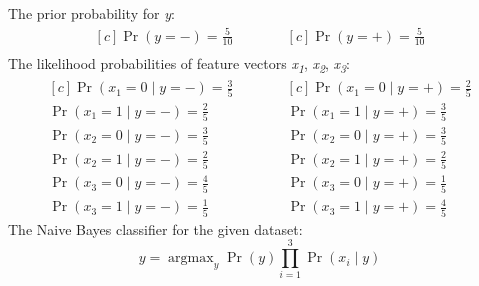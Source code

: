 \documentclass{article}
\DeclareMathOperator{\CondProb}{Pr}
\DeclareMathOperator{\argmax}{argmax}
\newcommand{\writex}[2]{{\it{#1\textsubscript#2}}}
\newcommand{\writey}[1]{{\it{#1}}}
\begin{document}
\subsection{}
The prior probability for \writey{y}:
\begin{equation*}
	\begin{aligned}[c]
	\CondProb{(y = -)} = \frac{5}{10}\\
	\end{aligned}
	\quad\quad\quad
	\begin{aligned}[c]
	\CondProb{(y = +)} = \frac{5}{10} \\
	\end{aligned}
\end{equation*}
The likelihood probabilities of feature vectors \writex{x}{1}, \writex{x}{2}, \writex{x}{3}:
\begin{equation*}
	\begin{aligned}[c]
	\CondProb{(x_1 = 0 \mid y = -)} = \frac{3}{5} \\
	\CondProb{(x_1 = 1 \mid y = -)} = \frac{2}{5} \\ 
	\CondProb{(x_2 = 0 \mid y = -)} = \frac{3}{5} \\
	\CondProb{(x_2 = 1 \mid y = -)} = \frac{2}{5} \\ 
	\CondProb{(x_3 = 0 \mid y = -)} = \frac{4}{5} \\
	\CondProb{(x_3 = 1 \mid y = -)} = \frac{1}{5}
	\end{aligned}
	\quad\quad\quad
	\begin{aligned}[c]
	\CondProb{(x_1 = 0 \mid y = +)} = \frac{2}{5} \\
	\CondProb{(x_1 = 1 \mid y = +)} = \frac{3}{5} \\ 
	\CondProb{(x_2 = 0 \mid y = +)} = \frac{3}{5} \\
	\CondProb{(x_2 = 1 \mid y = +)} = \frac{2}{5} \\ 
	\CondProb{(x_3 = 0 \mid y = +)} = \frac{1}{5} \\
	\CondProb{(x_3 = 1 \mid y = +)} = \frac{4}{5} 
\end{aligned}
\end{equation*}
The Naive Bayes classifier for the given dataset:
\begin{equation}
y = \argmax_y\CondProb{(y)} \prod_{i=1}^{3} \CondProb{(x_i  \mid y)}
\end{equation}
\end{document}
